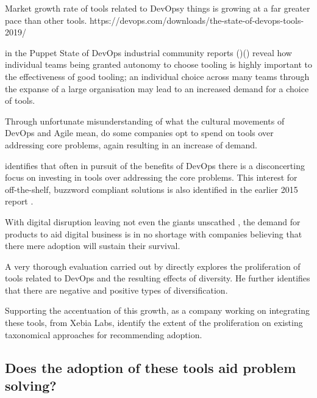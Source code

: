 Market growth rate of tools related to DevOpsy things is growing at a far greater pace than other tools. https://devops.com/downloads/the-state-of-devops-tools-2019/

\citeauthor{sodrPuppet2017} in the Puppet State of DevOps industrial community reports ()() reveal how individual teams being granted autonomy to choose tooling is highly important to the effectiveness of good tooling; an individual choice across many teams through the expanse of a large organisation may lead to an increased demand for a choice of tools.

Through unfortunate misunderstanding of what the cultural movements of DevOps and Agile mean, do some companies opt to spend on tools over addressing core problems, again resulting in an increase of demand.

\cite{sodrAccelerate2018} identifies that often in pursuit of the benefits of DevOps there is a disconcerting focus on investing in tools over addressing the core problems. This interest for off-the-shelf, buzzword compliant solutions is also identified in the earlier 2015 report \parencite{sodrPuppet2015}.

With digital disruption leaving not even the giants unscathed \parencite{weForum2016}, the demand for products to aid digital business is in no shortage with companies believing that there mere adoption will sustain their survival.

A very thorough evaluation carried out by \cite{kersten2018cambrian} directly explores the proliferation of tools related to DevOps and the resulting effects of diversity. He further identifies that there are negative and positive types of diversification.

Supporting the accentuation of this growth, as a company working on integrating these tools, \cite{xebiaLabs2019DevOpsReflections} from Xebia Labs, identify the extent of the proliferation on existing taxonomical approaches for recommending adoption.

\subsection{Does the adoption of these tools aid problem solving?}



